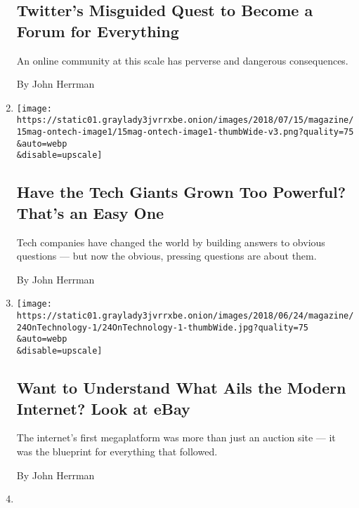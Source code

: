 \begin{enumerate}
  \hypertarget{twitters-misguided-quest-to-become-a-forum-for-everything}{%
  \subsection{Twitter's Misguided Quest to Become a Forum for
  Everything}\label{twitters-misguided-quest-to-become-a-forum-for-everything}}

  An online community at this scale has perverse and dangerous
  consequences.

  By John Herrman
\item
  \href{/2018/07/11/magazine/facebook-google-uber-tech-giants-power.html}{}

  \texttt{[image: https://static01.graylady3jvrrxbe.onion/images/2018/07/15/magazine/15mag-ontech-image1/15mag-ontech-image1-thumbWide-v3.png?quality=75\\\&auto=webp\\\&disable=upscale]}

  \hypertarget{have-the-tech-giants-grown-too-powerful-thats-an-easy-one}{%
  \subsection{Have the Tech Giants Grown Too Powerful? That's an Easy
  One}\label{have-the-tech-giants-grown-too-powerful-thats-an-easy-one}}

  Tech companies have changed the world by building answers to obvious
  questions --- but now the obvious, pressing questions are about them.

  By John Herrman
\item
  \href{/2018/06/20/magazine/want-to-understand-what-ails-the-modern-internet-look-at-ebay.html}{}

  \texttt{[image: https://static01.graylady3jvrrxbe.onion/images/2018/06/24/magazine/24OnTechnology-1/24OnTechnology-1-thumbWide.jpg?quality=75\\\&auto=webp\\\&disable=upscale]}

  \hypertarget{want-to-understand-what-ails-the-modern-internet-look-at-ebay}{%
  \subsection{Want to Understand What Ails the Modern Internet? Look at
  eBay}\label{want-to-understand-what-ails-the-modern-internet-look-at-ebay}}

  The internet's first megaplatform was more than just an auction site
  --- it was the blueprint for everything that followed.

  By John Herrman
\item
  \href{/2018/05/16/magazine/is-a-dumber-phone-a-better-phone.html}{}


\end{enumerate}

